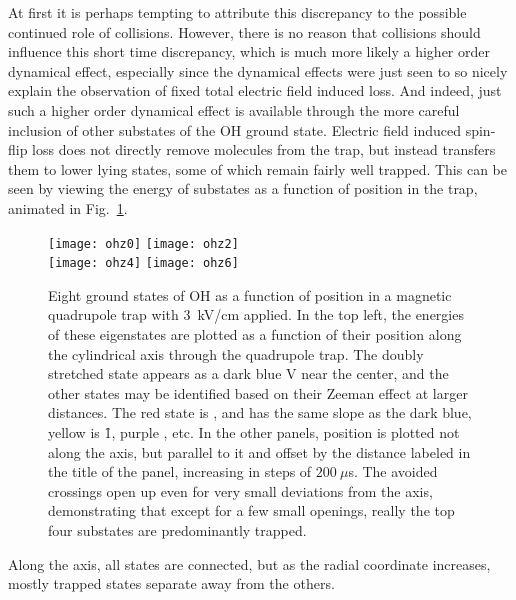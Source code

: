 
At first it is perhaps tempting to attribute this discrepancy to the possible continued role of collisions.
However, there is no reason that collisions should influence this short time discrepancy, which is much more likely a higher order dynamical effect, especially since the dynamical effects were just seen to so nicely explain the observation of fixed total electric field induced loss.
And indeed, just such a higher order dynamical effect is available through the more careful inclusion of other substates of the OH ground state.
Electric field induced spin-flip loss does not directly remove molecules from the trap, but instead transfers them to lower lying states, some of which remain fairly well trapped.
This can be seen by viewing the energy of substates as a function of position in the trap, animated in Fig.~\ref{manysubstates}.
\begin{figure}[t!]
\centering
\vspace{0.5mm}
\texttt{[image: ohz0]}
\texttt{[image: ohz2]}\\
\texttt{[image: ohz4]}
\texttt{[image: ohz6]}
\caption[Partially Trapped Substates in Electric and Magnetic Fields]{
Eight ground states of OH as a function of position in a magnetic quadrupole trap with $3$~kV/cm applied.
In the top left, the energies of these eigenstates are plotted as a function of their position along the cylindrical axis through the quadrupole trap.
The doubly stretched state appears as a dark blue V near the center, and the other states may be identified based on their Zeeman effect at larger distances.
The red state is , and has the same slope as the dark blue, yellow is \f1, purple , etc.
In the other panels, position is plotted not along the axis, but parallel to it and offset by the distance labeled in the title of the panel, increasing in steps of $200~\mu$s.
The avoided crossings open up even for very small deviations from the axis, demonstrating that except for a few small openings, really the top four substates are predominantly trapped.
\label{manysubstates}}
\end{figure}
Along the axis, all states are connected, but as the radial coordinate increases, mostly trapped states separate away from the others.
